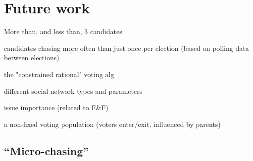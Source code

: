 \section{Future work}
\label{sec:future}


More than, and less than, 3 candidates

candidates chasing more often than just once per election (based on polling
data between elections)

the "constrained rational" voting alg

different social network types and parameters

issue importance (related to F\&F)

a non-fixed voting population (voters enter/exit, influenced by parents)

\subsection{``Micro-chasing''}
